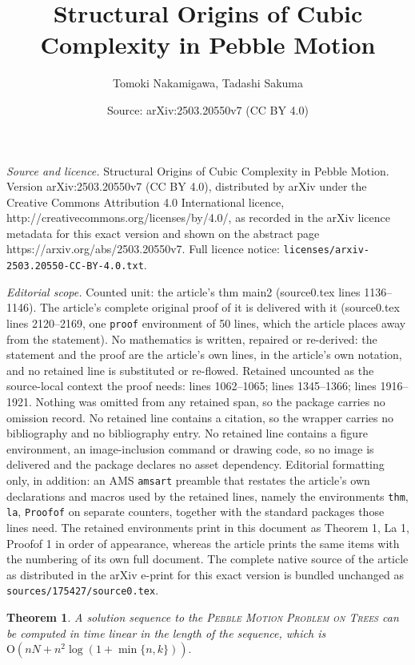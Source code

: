 \documentclass[10pt,a4paper]{amsart}
\title{Structural Origins of Cubic Complexity in Pebble Motion}
\author{Tomoki Nakamigawa, Tadashi Sakuma}
\date{Source: arXiv:2503.20550v7 (CC BY 4.0)}
\newtheorem{thm}{Theorem}
\newcommand{\Ord}{\mathrm{O}}
\begin{document}
\maketitle

\noindent\emph{Source and licence.} Structural Origins of Cubic Complexity in Pebble Motion. Version arXiv:2503.20550v7 (CC BY 4.0), distributed by arXiv under the Creative Commons Attribution 4.0 International licence, http://creativecommons.org/licenses/by/4.0/, as recorded in the arXiv licence metadata for this exact version and shown on the abstract page https://arxiv.org/abs/2503.20550v7. Full licence notice: \texttt{licenses/arxiv-2503.20550-CC-BY-4.0.txt}.\par\smallskip

\noindent\textit{Editorial scope.} Counted unit: the article's thm main2 (source0.tex lines 1136--1146). The article's complete original proof of it is delivered with it (source0.tex lines 2120--2169, one \texttt{proof} environment of 50 lines, which the article places away from the statement). No mathematics is written, repaired or re-derived: the statement and the proof are the article's own lines, in the article's own notation, and no retained line is substituted or re-flowed.  Retained uncounted as the source-local context the proof needs: lines 1062--1065; lines 1345--1366; lines 1916--1921.  Nothing was omitted from any retained span, so the package carries no omission record.  No retained line contains a citation, so the wrapper carries no bibliography and no bibliography entry.  No retained line contains a figure environment, an image-inclusion command or drawing code, so no image is delivered and the package declares no asset dependency.  Editorial formatting only, in addition: an AMS \texttt{amsart} preamble that restates the article's own declarations and macros used by the retained lines, namely the environments \texttt{thm}, \texttt{la}, \texttt{Proofof} on separate counters, together with the standard packages those lines need.  The retained environments print in this document as Theorem 1, La 1, Proofof 1 in order of appearance, whereas the article prints the same items with the numbering of its own full document.  The complete native source of the article as distributed in the arXiv e-print for this exact version is bundled unchanged as \texttt{sources/175427/source0.tex}.
\begin{thm}\label{main}
A solution sequence to the \textsc{Pebble Motion Problem on Trees} can be computed 
in time linear in the length of the sequence, which is $\Ord(nN + n^2 \log(1+\min\{n, k\})).$
\end{thm}
\end{document}
